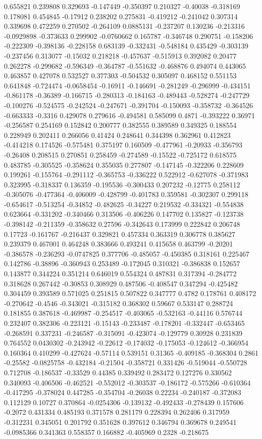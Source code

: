 0.655821 0.239808 0.329693 -0.147449 -0.350397 0.210327 -0.40038 -0.318169 0.178081 0.454845 -0.17912 0.238202 0.275831 -0.419212 -0.241042 0.307314 0.339698 0.472259 0.270502 -0.264109 0.0885131 -0.237207 0.130236 -0.213316 -0.0929898 -0.373633 0.299902 -0.0760662 0.165787 -0.346748 0.290751 -0.158206 -0.222309 -0.398136 -0.228158 0.683139 -0.332431 -0.548184 0.435429 -0.303139 -0.237456 0.313077 -0.15032 0.218218 -0.457637 -0.515913 0.392082 0.20477 0.262278 -0.299682 -0.596349 -0.364787 -0.551632 -0.468876 0.494074 0.443065 0.463857 0.427078 0.532527 0.377303 -0.504532 0.305097 0.468152 0.551153 0.641848 -0.724474 -0.0658454 -0.16911 -0.146691 -0.281249 -0.296999 -0.434151 -0.861178 -0.36389 -0.166715 -0.280313 -0.184163 -0.489443 -0.528274 -0.247729 -0.100276 -0.524575 -0.242524 -0.247671 -0.391704 -0.150093 -0.358732 -0.364526 -0.663333 -0.3316 0.429078 0.279616 -0.494581 0.585099 0.4871 -0.393222 0.36971 -0.256587 0.254169 0.152842 0.200777 0.382555 0.389589 0.349325 0.188554 0.228949 0.202411 0.266056 0.41424 0.248641 0.344398 0.362961 0.412823 -0.414218 0.174526 -0.575481 0.375197 0.160509 -0.477961 -0.20933 -0.356793 -0.26408 0.208515 0.270851 0.258459 -0.274589 -0.15522 -0.725172 0.618575 0.483785 -0.305525 -0.358624 0.355035 0.277807 -0.147145 -0.322206 0.228609 0.199261 -0.155764 -0.291112 -0.365753 -0.336222 0.522912 -0.627078 -0.371983 0.323995 -0.318337 0.136359 -0.195536 -0.300433 0.207232 -0.12775 0.258112 -0.305076 -0.477364 -0.406009 -0.428799 -0.401783 0.359581 -0.302307 0.299118 -0.654617 -0.513254 -0.34852 -0.482625 -0.34227 0.219532 -0.334321 -0.554838 0.623664 -0.331202 -0.340466 0.313506 -0.406226 0.147702 0.135827 -0.123738 -0.398142 -0.211359 -0.358632 0.27596 -0.342643 0.173999 0.222842 0.206748 0.17723 -0.161767 -0.216437 0.329821 0.457334 0.363319 0.306778 0.385627 0.239379 0.467001 0.464248 0.383666 0.493241 0.415658 0.463799 -0.20201 -0.386578 -0.236293 -0.0747825 0.377706 -0.485057 -0.450385 0.318161 0.225467 0.142786 -0.38896 -0.360943 0.253489 -0.172045 0.310321 -0.386838 0.152657 0.143877 0.344224 0.351214 0.646019 0.554324 0.487831 0.317394 -0.284772 0.318628 0.267442 -0.30853 0.308929 0.487506 -0.408547 0.347294 -0.425482 0.304459 0.393589 0.571025 0.251815 0.507822 0.347777 0.4782 0.178761 0.408172 -0.270642 -0.4546 -0.343021 -0.315182 0.368302 0.59667 0.533147 0.288724 0.181855 0.387618 -0.469987 -0.254517 -0.403065 -0.532163 -0.44116 0.576744 0.232407 0.382306 -0.223121 -0.15143 -0.233487 -0.178201 -0.332447 -0.653465 -0.268591 0.337231 -0.246587 -0.315091 -0.423074 -0.129779 0.30928 0.231839 0.764552 0.0430302 -0.243942 -0.22612 -0.174032 -0.175053 -0.124612 -0.366954 0.160364 0.410299 -0.427624 -0.57114 0.539151 0.31365 -0.409185 -0.368304 0.2861 -0.25582 -0.0825758 -0.432184 -0.21504 -0.358721 0.331426 -0.519044 -0.550728 0.712708 -0.186537 -0.33529 0.44385 0.339492 0.283472 0.127276 0.330562 0.340093 -0.406506 -0.462521 -0.552012 -0.303537 -0.186172 -0.575266 -0.610364 -0.417295 -0.378024 0.447285 -0.354704 -0.26038 0.22234 -0.240187 -0.372083 0.112129 0.10727 0.370864 -0.0254306 -0.139132 -0.492433 -0.278439 0.157606 -0.2072 0.431334 0.485193 0.371578 0.281179 0.228394 0.262406 0.317959 -0.312231 0.345051 0.201792 0.351628 0.397612 0.346794 0.369678 0.249541 -0.0985366 0.341363 0.558357 0.166882 -0.405969 0.2328 -0.218675 